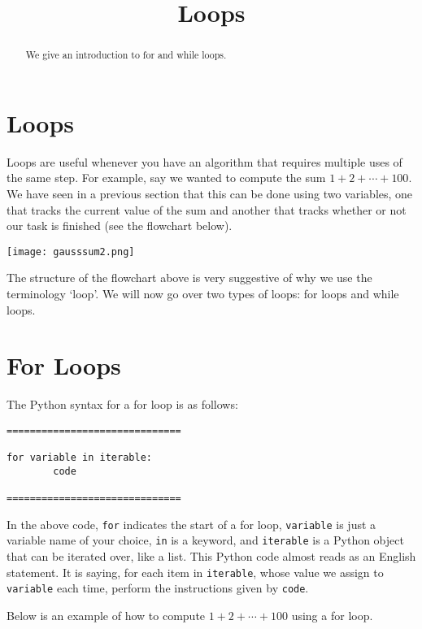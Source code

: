 \documentclass{ximera}
\title{Loops}
\begin{document}
  
\begin{abstract}  
We give an introduction to for and while loops.
\end{abstract}  
\maketitle

\section{Loops}

Loops are useful whenever you have an algorithm that requires multiple uses of the same step. For example, say we wanted to compute the sum $1+2+\cdots+100$. We have seen in a previous section that this can be done using two variables, one that tracks the current value of the sum and another that tracks whether or not our task is finished (see the flowchart below).

\begin{center}
	    \texttt{[image: gausssum2.png]}
\end{center}

The structure of the flowchart above is very suggestive of why we use the terminology `loop'. We will now go over two types of loops: for loops and while loops.

\section{For Loops}

The Python syntax for a for loop is as follows:

\begin{verbatim}
==============================

for variable in iterable:
        code

==============================
\end{verbatim}

In the above code, \verb|for| indicates the start of a for loop, \verb|variable| is just a variable name of your choice, \verb|in| is a keyword, and \verb|iterable| is a Python object that can be iterated over, like a list. This Python code almost reads as an English statement. It is saying, for each item in \verb|iterable|, whose value we assign to \verb|variable| each time, perform the instructions given by \verb|code|.

Below is an example of how to compute $1+2+\cdots+100$ using a for loop. 
\end{document}

